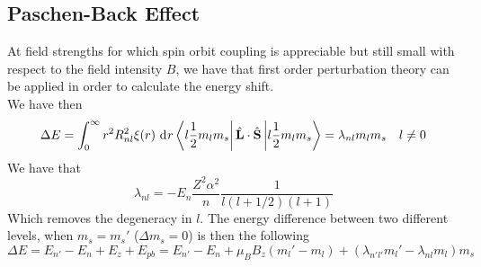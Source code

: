 \documentclass[../qm.tex]{subfiles}
\begin{document}
	\subsection{Paschen-Back Effect}
	At field strengths for which spin orbit coupling is appreciable but still small with respect to the field intensity $B$, we have that first order perturbation theory can be applied in order to calculate the energy shift.\\
	We have then
	\begin{equation}
		\Delta E=\int_{0}^{\infty}r^2R_{nl}^2\xi(r)\ \mathrm{d}^{}r\bra{l\frac{1}{2}m_lm_s}\hat{\mathbf{L}}\cdot\hat{\mathbf{S}}\ket{l\frac{1}{2}m_lm_s}=\lambda_{nl}m_lm_s\quad l\ne0
		\label{eq:paschenbackshiftfirstorder}
	\end{equation}
	We have that
	\begin{equation}
		\lambda_{nl}=-E_n\frac{Z^2\alpha^2}{n}\frac{1}{l(l+1/2)(l+1)}
		\label{eq:lambdapb}
	\end{equation}
	Which removes the degeneracy in $l$. The energy difference between two different levels, when $m_s=m_s'$ ($\Delta m_s=0$) is then the following
	\begin{equation}
		\Delta E=E_{n'}-E_n+E_{z}+E_{pb}=E_{n'}-E_n+\mu_BB_z(m_l'-m_l)+(\lambda_{n'l'}m_l'-\lambda_{nl}m_l)m_s
		\label{eq:paschenbackshift}
	\end{equation}
\end{document}
